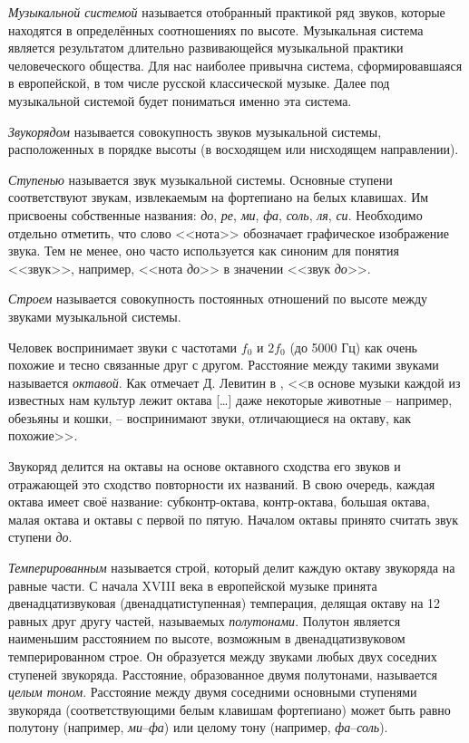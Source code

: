 \emph{Музыкальной системой} называется отобранный практикой ряд звуков, которые
находятся в определённых соотношениях по высоте. Музыкальная система является
результатом длительно развивающейся музыкальной практики человеческого общества.
Для нас наиболее привычна система, сформировавшаяся в европейской, в том числе
русской классической музыке. Далее под музыкальной системой будет пониматься
именно эта система.

\emph{Звукорядом} называется совокупность звуков музыкальной системы,
расположенных в порядке высоты (в восходящем или нисходящем направлении).

\emph{Ступенью} называется звук музыкальной системы. Основные ступени
соответствуют звукам, извлекаемым на фортепиано на белых клавишах. Им присвоены
собственные названия: \emph{до}, \emph{ре}, \emph{ми}, \emph{фа}, \emph{соль},
\emph{ля}, \emph{си}. Необходимо отдельно отметить, что слово <<нота>>
обозначает графическое изображение звука. Тем не менее, оно часто используется
как синоним для понятия <<звук>>, например, <<нота \emph{до}>> в значении
<<звук \emph{до}>>.

\emph{Строем} называется совокупность постоянных отношений по высоте между
звуками музыкальной системы.

Человек воспринимает звуки с частотами $f_0$ и $2f_0$ (до 5000 Гц) как очень
похожие и тесно связанные друг с другом. Расстояние между такими звуками
называется \emph{октавой}. Как отмечает Д. Левитин в \cite{Levitin2006}, <<в
основе музыки каждой из известных нам культур лежит октава [\ldots] даже
некоторые животные -- например, обезьяны и кошки, -- воспринимают звуки,
отличающиеся на октаву, как похожие>>.

Звукоряд делится на октавы на основе октавного сходства его звуков и отражающей
это сходство повторности их названий. В свою очередь, каждая октава имеет своё
название: субконтр-октава, контр-октава, большая октава, малая октава и октавы с
первой по пятую. Началом октавы принято считать звук ступени \emph{до}.

\emph{Темперированным} называется строй, который делит каждую октаву звукоряда
на равные части. С начала XVIII века в европейской музыке принята
двенадцатизвуковая (двенадцатиступенная) темперация, делящая октаву на 12 равных
друг другу частей, называемых \emph{полутонами}. Полутон является наименьшим
расстоянием по высоте, возможным в двенадцатизвуковом темперированном строе. Он
образуется между звуками любых двух соседних ступеней звукоряда. Расстояние,
образованное двумя полутонами, называется \emph{целым тоном}. Расстояние между
двумя соседними основными ступенями звукоряда (соответствующими белым клавишам
фортепиано) может быть равно полутону (например, \emph{ми}--\emph{фа}) или
целому тону (например, \emph{фа}--\emph{соль}).

